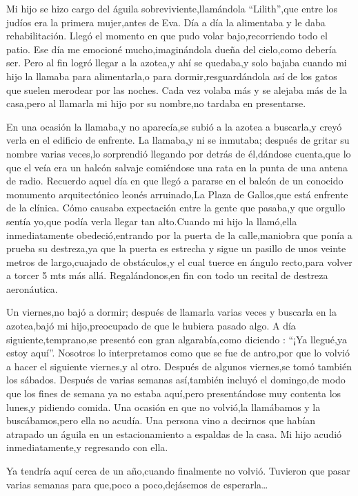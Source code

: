 \documentclass[letterpaper,12pt]{book}
\begin{document}
Mi hijo se hizo cargo del águila sobreviviente,llamándola ``Lilith'',que entre los judíos era la primera mujer,antes de Eva. Día a día la alimentaba y le daba rehabilitación. Llegó el momento en que pudo volar bajo,recorriendo todo el patio. Ese día me emocioné mucho,imaginándola dueña del cielo,como debería ser. Pero al fin logró llegar a la azotea,y ahí se quedaba,y solo bajaba cuando mi hijo la llamaba para alimentarla,o para dormir,resguardándola así de los gatos que suelen merodear por las noches. Cada vez volaba más y se alejaba más de la casa,pero al llamarla mi hijo por su nombre,no tardaba en presentarse.

En una ocasión la llamaba,y no aparecía,se subió a la azotea a buscarla,y creyó verla en el edificio de enfrente. La llamaba,y ni se inmutaba; después de gritar su nombre varias veces,lo sorprendió llegando por detrás de él,dándose cuenta,que lo que el veía era un halcón salvaje comiéndose una rata en la punta de una antena de radio. Recuerdo aquel día en que llegó a pararse en el balcón de un conocido monumento arquitectónico leonés arruinado,La Plaza de Gallos,que está enfrente de la clínica. Cómo causaba expectación entre la gente que pasaba,y que orgullo sentía yo,que podía verla llegar tan alto.Cuando mi hijo la llamó,ella inmediatamente obedeció,entrando por la puerta de la calle,maniobra que ponía a prueba su destreza,ya que la puerta es estrecha y sigue un pasillo de unos veinte metros de largo,cuajado de obstáculos,y el cual tuerce en ángulo recto,para volver a torcer 5 mts más allá. Regalándonos,en fin con todo un recital de destreza aeronáutica.


Un viernes,no bajó a dormir; después de llamarla varias veces y buscarla en la azotea,bajó mi hijo,preocupado de que le hubiera pasado algo. A día siguiente,temprano,se presentó con gran algarabía,como diciendo : ``¡Ya llegué,ya estoy aquí''. Nosotros lo interpretamos como que se fue de antro,por que lo volvió a hacer el siguiente viernes,y al otro. Después de algunos viernes,se tomó también los sábados. Después de varias semanas así,también incluyó el domingo,de modo que los fines de semana ya no estaba aquí,pero presentándose muy contenta los lunes,y pidiendo comida. Una ocasión en que no volvió,la llamábamos y  la buscábamos,pero ella no acudía. Una persona vino a decirnos que habían atrapado un águila en un estacionamiento a espaldas de la casa. Mi hijo acudió inmediatamente,y regresando con ella. 


Ya tendría aquí cerca de un año,cuando finalmente no volvió. Tuvieron que pasar varias semanas para que,poco a poco,dejásemos de esperarla\ldots
\end{document}
